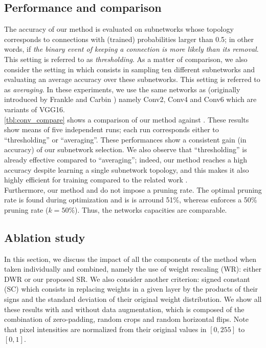     

\subsection{Performance and comparison}
The accuracy of our method is evaluated on subnetworks whose topology
corresponds to connections with  (trained) probabilities larger than 0.5;  in
other words,  if {\it the binary event of keeping a connection is more likely
than its removal}.  This setting is referred to as  {\it thresholding}.  As a
matter of comparison,  we also consider the setting in
\cite{DBLP:conf/nips/ZhouLLY19} which consists in sampling ten different
subnetworks and evaluating an average accuracy over  these subnetworks.  This
setting  is referred to as {\it averaging}.  In these experiments,  we use the
same networks as
\cite{DBLP:conf/nips/ZhouLLY19,DBLP:conf/cvpr/RamanujanWKFR20} (originally
introduced by  Frankle and Carbin \cite{DBLP:conf/iclr/FrankleC19}) namely
Conv2,  Conv4 and Conv6 which are  variants of  VGG16. \\
\indent   \cref{tbl:conv_compare}  shows a comparison of our method against
\cite{DBLP:conf/nips/ZhouLLY19,DBLP:conf/cvpr/RamanujanWKFR20}.    These
results show means of five independent runs; each run corresponds either to
``thresholding'' or ``averaging''.  These performances show a consistent gain
(in accuracy) of our subnetwork selection.   We also observe that
``thresholding'' is already effective compared to ``averaging''; indeed, our
method reaches a  high accuracy despite learning a single subnetwork topology,
and this makes it also highly efficient for training compared to  the related
work \cite{DBLP:conf/nips/ZhouLLY19,DBLP:conf/cvpr/RamanujanWKFR20}.\\ 
\indent Furthermore, our method and \cite{DBLP:conf/nips/ZhouLLY19} do not
impose a pruning rate. The optimal pruning rate is found during optimization and
is is arround 51\%, whereas \cite{DBLP:conf/cvpr/RamanujanWKFR20} enforces a 50\%
pruning rate ($k=50\%$). Thus, the networks capacities
are comparable. \\


  \subsection{Ablation study}
  In this section, we discuss the impact of all the components of the method
  when taken individually and combined,  namely the use of weight rescaling
  (WR): either DWR or our proposed SR.   We also consider another criterion:
  signed constant  (SC) which consists in replacing weights in a given layer by
  the products of their signs and the standard deviation of their original
  weight distribution.  We show  all these results with and without data
  augmentation, which is composed of the combination of zero-padding,  random crops and
  random  horizontal flips.   Note that  pixel intensities are normalized  from
  their original values in $[0,255]$ to $[0,1]$.
    
